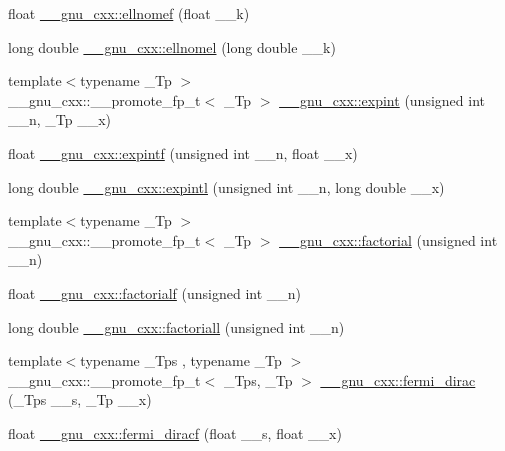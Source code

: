 \begin{DoxyCompactItemize}
float \hyperlink{group__gnu__math__spec__func_gad3ba08e5843ea0ec2bb9ddde3033adff}{\+\_\+\+\_\+gnu\+\_\+cxx\+::ellnomef} (float \+\_\+\+\_\+k)
\item 
long double \hyperlink{group__gnu__math__spec__func_ga0774570b24f654f8ae39e1865613a4e2}{\+\_\+\+\_\+gnu\+\_\+cxx\+::ellnomel} (long double \+\_\+\+\_\+k)
\item 
{\footnotesize template$<$typename \+\_\+\+Tp $>$ }\\\+\_\+\+\_\+gnu\+\_\+cxx\+::\+\_\+\+\_\+promote\+\_\+fp\+\_\+t$<$ \+\_\+\+Tp $>$ \hyperlink{group__gnu__math__spec__func_ga2cfc699129ceac9cfed87c61e6dc0e08}{\+\_\+\+\_\+gnu\+\_\+cxx\+::expint} (unsigned int \+\_\+\+\_\+n, \+\_\+\+Tp \+\_\+\+\_\+x)
\item 
float \hyperlink{group__gnu__math__spec__func_ga85751691a29807d99e990fcba61312f3}{\+\_\+\+\_\+gnu\+\_\+cxx\+::expintf} (unsigned int \+\_\+\+\_\+n, float \+\_\+\+\_\+x)
\item 
long double \hyperlink{group__gnu__math__spec__func_ga720ca0b275784c8b82193f427a2b3553}{\+\_\+\+\_\+gnu\+\_\+cxx\+::expintl} (unsigned int \+\_\+\+\_\+n, long double \+\_\+\+\_\+x)
\item 
{\footnotesize template$<$typename \+\_\+\+Tp $>$ }\\\+\_\+\+\_\+gnu\+\_\+cxx\+::\+\_\+\+\_\+promote\+\_\+fp\+\_\+t$<$ \+\_\+\+Tp $>$ \hyperlink{group__gnu__math__spec__func_ga48bc268969bfc03eaeaf4bfd457bb25c}{\+\_\+\+\_\+gnu\+\_\+cxx\+::factorial} (unsigned int \+\_\+\+\_\+n)
\item 
float \hyperlink{group__gnu__math__spec__func_ga5a288283a8ed63e1d2b0145f313a5378}{\+\_\+\+\_\+gnu\+\_\+cxx\+::factorialf} (unsigned int \+\_\+\+\_\+n)
\item 
long double \hyperlink{group__gnu__math__spec__func_ga0904e504fdc3c8b9b6f5c66a73531584}{\+\_\+\+\_\+gnu\+\_\+cxx\+::factoriall} (unsigned int \+\_\+\+\_\+n)
\item 
{\footnotesize template$<$typename \+\_\+\+Tps , typename \+\_\+\+Tp $>$ }\\\+\_\+\+\_\+gnu\+\_\+cxx\+::\+\_\+\+\_\+promote\+\_\+fp\+\_\+t$<$ \+\_\+\+Tps, \+\_\+\+Tp $>$ \hyperlink{group__gnu__math__spec__func_ga47dd583a4f3a19f797a5e074e357ba36}{\+\_\+\+\_\+gnu\+\_\+cxx\+::fermi\+\_\+dirac} (\+\_\+\+Tps \+\_\+\+\_\+s, \+\_\+\+Tp \+\_\+\+\_\+x)
\item 
float \hyperlink{group__gnu__math__spec__func_gacf7f49b2b7bf50fd37d939236712cbe2}{\+\_\+\+\_\+gnu\+\_\+cxx\+::fermi\+\_\+diracf} (float \+\_\+\+\_\+s, float \+\_\+\+\_\+x)
\item 

\end{DoxyCompactItemize}
